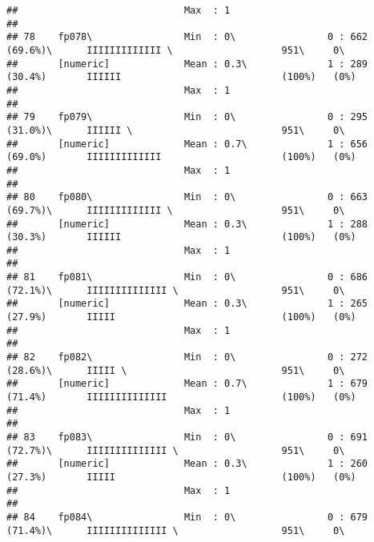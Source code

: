 \documentclass[]{article}
\begin{document}
\begin{verbatim}
##                             Max  : 1                                                                                           
## 
## 78    fp078\                Min  : 0\                0 : 662 (69.6%)\      IIIIIIIIIIIII \                   951\     0\       
##       [numeric]             Mean : 0.3\              1 : 289 (30.4%)       IIIIII                            (100%)   (0%)     
##                             Max  : 1                                                                                           
## 
## 79    fp079\                Min  : 0\                0 : 295 (31.0%)\      IIIIII \                          951\     0\       
##       [numeric]             Mean : 0.7\              1 : 656 (69.0%)       IIIIIIIIIIIII                     (100%)   (0%)     
##                             Max  : 1                                                                                           
## 
## 80    fp080\                Min  : 0\                0 : 663 (69.7%)\      IIIIIIIIIIIII \                   951\     0\       
##       [numeric]             Mean : 0.3\              1 : 288 (30.3%)       IIIIII                            (100%)   (0%)     
##                             Max  : 1                                                                                           
## 
## 81    fp081\                Min  : 0\                0 : 686 (72.1%)\      IIIIIIIIIIIIII \                  951\     0\       
##       [numeric]             Mean : 0.3\              1 : 265 (27.9%)       IIIII                             (100%)   (0%)     
##                             Max  : 1                                                                                           
## 
## 82    fp082\                Min  : 0\                0 : 272 (28.6%)\      IIIII \                           951\     0\       
##       [numeric]             Mean : 0.7\              1 : 679 (71.4%)       IIIIIIIIIIIIII                    (100%)   (0%)     
##                             Max  : 1                                                                                           
## 
## 83    fp083\                Min  : 0\                0 : 691 (72.7%)\      IIIIIIIIIIIIII \                  951\     0\       
##       [numeric]             Mean : 0.3\              1 : 260 (27.3%)       IIIII                             (100%)   (0%)     
##                             Max  : 1                                                                                           
## 
## 84    fp084\                Min  : 0\                0 : 679 (71.4%)\      IIIIIIIIIIIIII \                  951\     0\       

\end{verbatim}
\end{document}
